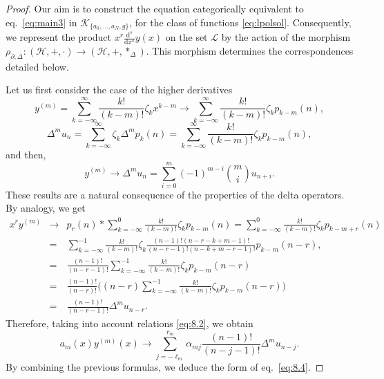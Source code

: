 \documentclass[10pt]{amsart}
\numberwithin{equation}{section}
\theoremstyle{definition}
\begin{document}
\begin{proof}
Our aim is to construct the equation categorically equivalent to eq.~\eqref{eq:main3}
in $\mathcal{K}_{\{ a_{0},\ldots , a_{N},g\}}$, for the class of functions \eqref{eq:lpolsol}. Consequently, we represent the product
$x^{r}\frac{\mathrm{d}^{s}}{\mathrm{d}x^{s}}y(x)$ on the set
$\mathcal{L}$ by the action of the morphism
$\rho _{\partial ,\Delta}: (\mathcal{H},+,\cdot )\rightarrow (
\mathcal{H},+,*_{\Delta})$. This morphism determines the correspondences
detailed below.

Let us first consider the case of the higher derivatives
\begin{equation}
y^{(m)}=\sum _{k=-\infty}^{\infty}\frac{k!}{(k-m)!}\zeta _{k}x^{k-m}
\longrightarrow \sum _{k=-\infty}^{\infty}\frac{k!}{(k-m)!}\zeta _{k} p_{k-m}(n),
\label{eq8.6}
\end{equation}
\begin{equation}
\Delta ^{m}u_{n}=\sum _{k=-\infty}^{\infty} \zeta _{k} \Delta ^{m}p_{k
}(n)=\sum _{k=-\infty}^{\infty} \frac{k!}{(k-m)!}\zeta _{k} p_{k-m}(n),
\label{eq8.7}
\end{equation}
and then,
\begin{equation}
y^{(m)}\longrightarrow \Delta ^{m} u_{n}= \sum _{i=0}^{m}(-1)^{m-i}
\binom{m}{i}u_{n+i}.
\label{eq8.8}
\end{equation}
These results are a natural consequence of the properties of the delta
operators. By analogy, we get
\begin{eqnarray*}
x^{r} y^{(m)} &\longrightarrow & p_{r}(n)*\sum _{k=-\infty}^{0}
\frac{k!}{(k-m)!}\zeta _{k} p_{k-m}(n)=\sum _{k=-\infty}^{0}
\frac{k!}{(k-m)!} \zeta _{k} p_{k-m+r}(n)
\\
&=&\sum _{k=-\infty}^{-1} \frac{k!}{(k-m)!}\zeta _{k}
\frac{(n-1)!(n-r-k+m-1)!}{(n-r-1)!(n-k+m-r-1)!}p_{k-m}(n-r),
\\
&=&\frac{(n-1)!}{(n-r-1)!}\sum _{k=-\infty}^{-1} \frac{k!}{(k-m)!}
\zeta _{k} p_{k-m}(n-r)
\\
&=&\frac{(n-1)!}{(n-r)!}\bigg((n-r)\sum _{k=-\infty}^{-1}
\frac{k!}{(k-m)!} \zeta _{k} p_{k-m}(n-r)\bigg)
\\
&=&\frac{(n-1)!}{(n-r-1)!}\Delta ^{m}u_{n-r}.
\end{eqnarray*}
Therefore, taking into account relations  \eqref{eq:8.2}, we obtain
\begin{equation}
a_{m}(x)y^{(m)}(x) \to \sum _{j=-\ell _{m}}^{r_{m}} \alpha _{mj}
\frac{(n-1)!}{(n-j-1)!}\Delta ^{m}u_{n-j}.
\label{eq8.9}
\end{equation}
By combining the previous formulas, we deduce the form of eq.~\eqref{eq:8.4}.


\end{proof}
\end{document}
